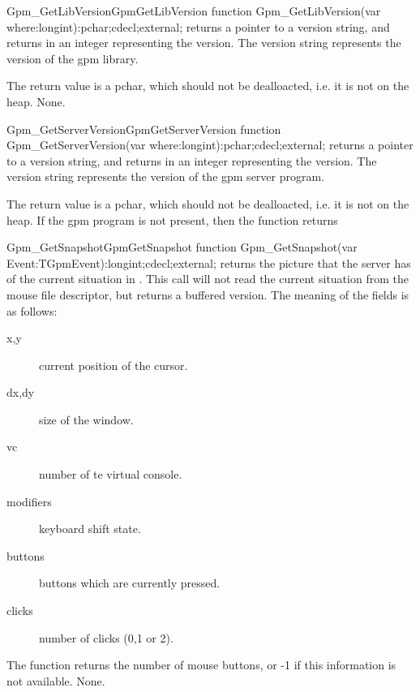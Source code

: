 
\begin{functionl}{Gpm\_GetLibVersion}{GpmGetLibVersion}
\Declaration
function Gpm\_GetLibVersion(var where:longint):pchar;cdecl;external;
\Description
{} returns a pointer to a version string, and returns
in  an integer representing the version. The version string
represents the version of the gpm library.

The return value is a pchar, which should not be dealloacted, i.e. it is not
on the heap.
\Errors
None.
\SeeAlso
{}
\end{functionl}

\begin{functionl}{Gpm\_GetServerVersion}{GpmGetServerVersion}
\Declaration
function Gpm\_GetServerVersion(var where:longint):pchar;cdecl;external;
\Description
{} returns a pointer to a version string, and 
returns in  an integer representing the version. The version string
represents the version of the gpm server program.

The return value is a pchar, which should not be dealloacted, i.e. it is not
on the heap.
\Errors
If the gpm program is not present, then the function returns 
\SeeAlso
{}
\end{functionl}

\begin{functionl}{Gpm\_GetSnapshot}{GpmGetSnapshot}
\Declaration
function Gpm\_GetSnapshot(var Event:TGpmEvent):longint;cdecl;external;
\Description
{} returns the picture that the server has of the 
current situation in . 
This call will not read the current situation from the mouse file
descriptor, but returns a buffered version.
The meaning of the fields is as follows:
\begin{description}
\item[x,y] current position of the cursor.
\item[dx,dy] size of the window.
\item[vc] number of te virtual console.
\item[modifiers] keyboard shift state.
\item[buttons] buttons which are currently pressed.
\item[clicks] number of clicks (0,1 or 2).
\end{description}
The function returns the number of mouse buttons, or -1 if this information
is not available.
\Errors
None.
\SeeAlso
{}
\end{functionl}


